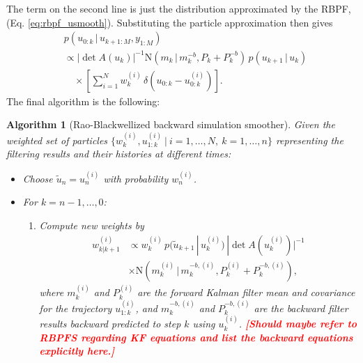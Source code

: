 \documentclass[twocolumn]{autart}    %
\newcommand{\comment}[1]{\textcolor{red}{\textbf{[#1]}}}
\newtheorem{algo}{Algorithm}[section]
\begin{document}
%
The term on the second line is just the distribution approximated by
the RBPF, (Eq. \eqref{eq:rbpf_usmooth}). Substituting the particle
approximation then gives
%
\begin{equation}
\begin{split}
  &p(u_{0:k}\,|\,u_{k+1:M},y_{1:M}) \\
  &\propto
  |\det A(u_k)|^{-1}
  \mathrm{N}(m_k\,|\,m^{-b}_{k},P_k+P^{-b}_{k}) \, p(u_{k+1}\,|\,u_{k}) \\
  &\quad \times
  \left[ \sum_{i=1}^N w^{(i)}_k \, \delta(u_{0:k} - u^{(i)}_{0:k}) \right].
\end{split}
\label{eq:rbbacksimeq}
\end{equation}
%
The final algorithm is the following:
%
\begin{algo}[Rao-Blackwellized backward simulation smoother]
  \label{alg:rbbssmooth}
  Given the weighted set of particles $\{ w_k^{(i)}, u_{1:k}^{(i)} ~|~
  i=1,\ldots,N,~k=1,\ldots,n \}$ representing the filtering results
  and their histories at different times:
\begin{itemize}
\item Choose $\tilde{u}_n = u_n^{(i)}$ with probability $w^{(i)}_{n}$.
\item For $k=n-1,\ldots,0$:
\begin{enumerate}
  \item Compute new weights by
    \begin{equation}
      \begin{split}
        w^{(i)}_{k|k+1} &\propto
        w_k^{(i)} \,
        p(\tilde{u}_{k+1}\,|\,u_{k}^{(i)}) \,
        |\det A(u_k^{(i)})|^{-1} \\
        &\times
        \mathrm{N}(m^{(i)}_k \,|\,m^{-b,(i)}_{k},P^{(i)}_k+P^{-b,(i)}_{k}),
     \end{split}
    \end{equation}
    where $m^{(i)}_k$ and $P^{(i)}_k$ are the forward Kalman filter
    mean and covariance for the trajectory $u_{1:k}^{(i)}$, and
    $m^{-b,(i)}_{k}$ and $P^{-b,(i)}_{k}$ are the backward filter
    results backward predicted to step $k$ using $u_k^{(i)}$.
   \comment{Should maybe refer to RBPFS regarding KF equations
   and list the backward equations explicitly here.}


\end{enumerate}
\end{itemize}
\end{algo}
\end{document}
